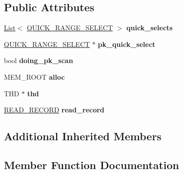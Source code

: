 \subsection*{Public Attributes}
\begin{DoxyCompactItemize}
\item 
\mbox{\label{classQUICK__INDEX__MERGE__SELECT_a6d3835b2af3ee4e5428650b54d039185}} 
\mbox{\hyperlink{classList}{List}}$<$ \mbox{\hyperlink{classQUICK__RANGE__SELECT}{Q\+U\+I\+C\+K\+\_\+\+R\+A\+N\+G\+E\+\_\+\+S\+E\+L\+E\+CT}} $>$ {\bfseries quick\+\_\+selects}
\item 
\mbox{\label{classQUICK__INDEX__MERGE__SELECT_afe1fb829e809ab5bdae2fc231c2dfdfc}} 
\mbox{\hyperlink{classQUICK__RANGE__SELECT}{Q\+U\+I\+C\+K\+\_\+\+R\+A\+N\+G\+E\+\_\+\+S\+E\+L\+E\+CT}} $\ast$ {\bfseries pk\+\_\+quick\+\_\+select}
\item 
\mbox{\label{classQUICK__INDEX__MERGE__SELECT_a79f9fc68e840ba8eb615c707e3f15501}} 
bool {\bfseries doing\+\_\+pk\+\_\+scan}
\item 
\mbox{\label{classQUICK__INDEX__MERGE__SELECT_a120618862c4ec67d3ce4e29b1bbd6237}} 
M\+E\+M\+\_\+\+R\+O\+OT {\bfseries alloc}
\item 
\mbox{\label{classQUICK__INDEX__MERGE__SELECT_ab2ec54cf32484d69072fef864cf2d6e7}} 
T\+HD $\ast$ {\bfseries thd}
\item 
\mbox{\label{classQUICK__INDEX__MERGE__SELECT_a1397ccba5bb5a5001e88a2391c1b6d32}} 
\mbox{\hyperlink{structREAD__RECORD}{R\+E\+A\+D\+\_\+\+R\+E\+C\+O\+RD}} {\bfseries read\+\_\+record}
\end{DoxyCompactItemize}
\subsection*{Additional Inherited Members}


\subsection{Member Function Documentation}
\mbox{\label{classQUICK__INDEX__MERGE__SELECT_a86dbd62d24d324f5203d6c475eed86e0}} 
